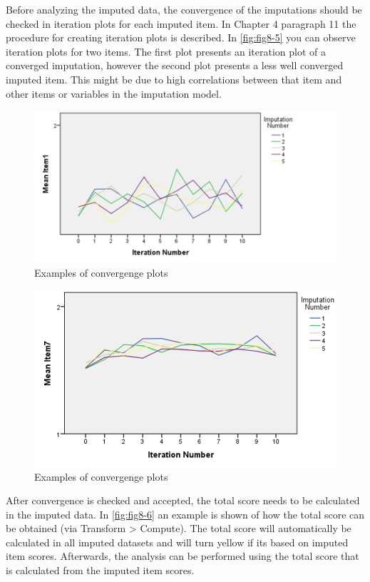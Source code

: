 \documentclass[
]{book}
\begin{document}
Before analyzing the imputed data, the convergence of the imputations should be checked in iteration plots for each imputed item. In Chapter 4 paragraph 11 the procedure for creating iteration plots is described. In \ref{fig:fig8-5} you can observe iteration plots for two items. The first plot presents an iteration plot of a converged imputation, however the second plot presents a less well converged imputed item. This might be due to high correlations between that item and other items or variables in the imputation model.

\begin{figure}

{\centering \includegraphics[width=0.9\linewidth]{images/fig8.5a} 

}

\caption{Examples of convergenge plots}\label{fig:fig8-51}
\end{figure}
\begin{figure}

{\centering \includegraphics[width=0.9\linewidth]{images/fig8.5b} 

}

\caption{Examples of convergenge plots}\label{fig:fig8-52}
\end{figure}

After convergence is checked and accepted, the total score needs to be calculated in the imputed data. In \ref{fig:fig8-6} an example is shown of how the total score can be obtained (via Transform \textgreater{} Compute). The total score will automatically be calculated in all imputed datasets and will turn yellow if its based on imputed item scores. Afterwards, the analysis can be performed using the total score that is calculated from the imputed item scores.
\end{document}
